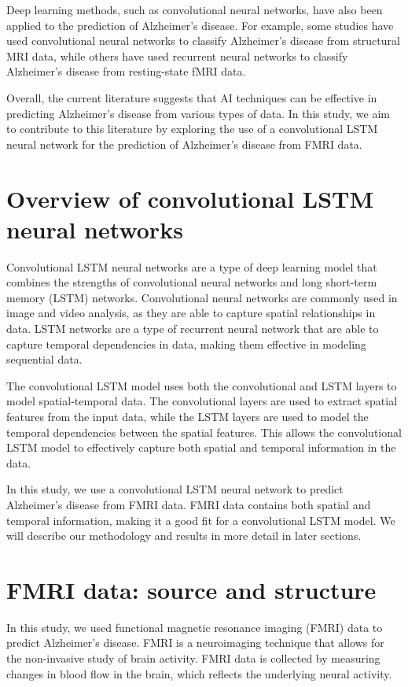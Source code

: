 \documentclass[10pt]{article}
\begin{document}
	Deep learning methods, such as convolutional neural networks, have also been applied to the prediction of Alzheimer's disease. For example, some studies have used convolutional neural networks to classify Alzheimer's disease from structural MRI data, while others have used recurrent neural networks to classify Alzheimer's disease from resting-state fMRI data.

	Overall, the current literature suggests that AI techniques can be effective in predicting Alzheimer's disease from various types of data. In this study, we aim to contribute to this literature by exploring the use of a convolutional LSTM neural network for the prediction of Alzheimer's disease from FMRI data.

	\section{Overview of convolutional LSTM neural networks}

	Convolutional LSTM neural networks are a type of deep learning model that combines the strengths of convolutional neural networks and long short-term memory (LSTM) networks. Convolutional neural networks are commonly used in image and video analysis, as they are able to capture spatial relationships in data. LSTM networks are a type of recurrent neural network that are able to capture temporal dependencies in data, making them effective in modeling sequential data.

	The convolutional LSTM model uses both the convolutional and LSTM layers to model spatial-temporal data. The convolutional layers are used to extract spatial features from the input data, while the LSTM layers are used to model the temporal dependencies between the spatial features. This allows the convolutional LSTM model to effectively capture both spatial and temporal information in the data.

	In this study, we use a convolutional LSTM neural network to predict Alzheimer's disease from FMRI data. FMRI data contains both spatial and temporal information, making it a good fit for a convolutional LSTM model. We will describe our methodology and results in more detail in later sections.

	\section{FMRI data: source and structure}
	\label{sec:data}

	In this study, we used functional magnetic resonance imaging (FMRI) data to predict Alzheimer's disease. FMRI is a neuroimaging technique that allows for the non-invasive study of brain activity. FMRI data is collected by measuring changes in blood flow in the brain, which reflects the underlying neural activity.
\end{document}
